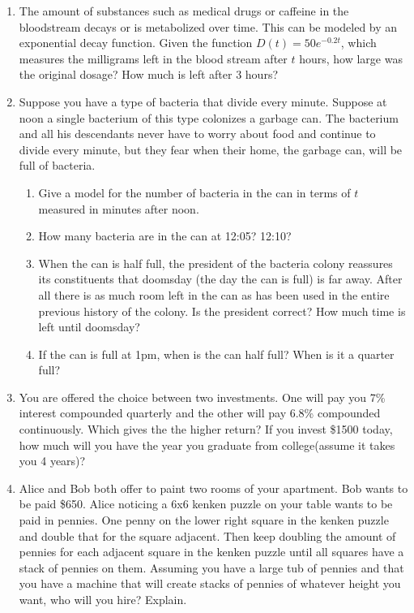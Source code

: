 \documentclass[12pt]{article}
\theoremstyle{plain}     %
\begin{document}
\begin{enumerate}
	\item The amount of substances such as medical drugs or caffeine in the bloodstream decays or is metabolized over time. This can be modeled by an exponential decay function. Given the function $D(t)=50e^{-0.2t}$, which measures the milligrams left in the blood stream after $t$ hours, how large was the original dosage? How much is left after 3 hours?\\
	\item Suppose you have a type of bacteria that divide every minute. Suppose at noon a single bacterium of this type colonizes a garbage can. The bacterium and all his descendants never have to worry about food and continue to divide every minute, but they fear when their home, the garbage can, will be full of bacteria.
		\begin{enumerate}
			\item Give a model for the number of bacteria in the can in terms of $t$ measured in minutes after noon.\\
			\item How many bacteria are in the can at 12:05? 12:10?\\
			\item When the can is half full, the president of the bacteria colony reassures its constituents that doomsday (the day the can is full) is far away. After all there is as much room left in the can as has been used in the entire previous history of the colony. Is the president correct? How much time is left until doomsday?\\
			\item If the can is full at 1pm, when is the can half full? When is it a quarter full?
			\end{enumerate}
		\item You are offered the choice between two investments. One will pay you 7\% interest compounded quarterly and the other will pay 6.8\% compounded continuously. Which gives the the higher return? If you invest \$1500 today, how much will you have the year you graduate from college(assume it takes you 4 years)?\\
		\newpage
		\item Alice and Bob both offer to paint two rooms of your apartment. Bob wants to be paid \$650. Alice noticing a 6x6 kenken puzzle on your table wants to be paid in pennies. One penny on the lower right square in the kenken puzzle and double that for the square adjacent. Then keep doubling the amount of pennies for each adjacent square in the kenken puzzle until all squares have a stack of pennies on them. Assuming you have a large tub of pennies and that you have a machine that will create stacks of pennies of whatever height you want, who will you hire? Explain.\\


\end{enumerate}
\end{document}
